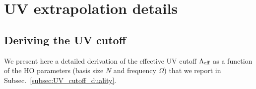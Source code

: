 \cleardoublepage
\chapter{UV extrapolation details}
\label{Appendix:UV_extra_details}

  \section{Deriving the UV cutoff}

  We present here a detailed derivation of the effective UV cutoff $\Lambda_{\rm eff}$
  as a function of the HO parameters (basis size $N$ and frequency $\Omega$)
  that we report in Subsec.~\ref{subsec:UV_cutoff_duality}.

